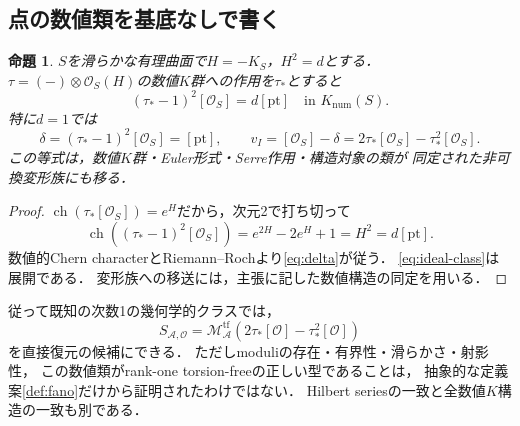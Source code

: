 \documentclass[11pt,a4paper]{ltjsarticle}
\newtheorem{proposition}[theorem]{命題}
\theoremstyle{definition}
\newcommand{\OO}{\mathcal O}
\renewcommand{\AA}{\mathcal A}
\newcommand{\ch}{\operatorname{ch}}
\begin{document}
\subsection{点の数値類を基底なしで書く}
\begin{proposition}\label{prop:point-class}
$S$を滑らかな有理曲面で$H=-K_S$，$H^2=d$とする．
$\tau=(-)\otimes\OO_S(H)$の数値$K$群への作用を$\tau_*$とすると
\begin{equation}\label{eq:delta}
 (\tau_*-1)^2[\OO_S]=d[\mathrm{pt}]
 \quad\text{in }K_{\mathrm{num}}(S).
\end{equation}
特に$d=1$では
\begin{equation}\label{eq:ideal-class}
 \delta=(\tau_*-1)^2[\OO_S]=[\mathrm{pt}],\qquad
 v_I=[\OO_S]-\delta
     =2\tau_*[\OO_S]-\tau_*^2[\OO_S].
\end{equation}
この等式は，数値$K$群・Euler形式・Serre作用・構造対象の類が
同定された非可換変形族にも移る．
\end{proposition}
\begin{proof}
$\ch(\tau_*[\OO_S])=e^H$だから，次元2で打ち切って
\[
 \ch((\tau_*-1)^2[\OO_S])
 =e^{2H}-2e^H+1=H^2=d[\mathrm{pt}].
\]
数値的Chern characterとRiemann--Rochより\eqref{eq:delta}が従う．
\eqref{eq:ideal-class}は展開である．
変形族への移送には，主張に記した数値構造の同定を用いる．
\end{proof}

従って既知の次数1の幾何学的クラスでは，
\begin{equation}\label{eq:intrinsic-hilb}
 S_{\AA,\OO}
 =
 \mathcal M_{\AA}^{\mathrm{tf}}
 \left(2\tau_*[\OO]-\tau_*^2[\OO]\right)
\end{equation}
を直接復元の候補にできる．
ただしmoduliの存在・有界性・滑らかさ・射影性，
この数値類がrank-one torsion-freeの正しい型であることは，
抽象的な定義案\ref{def:fano}だけから証明されたわけではない．
Hilbert seriesの一致と全数値$K$構造の一致も別である．
\end{document}
